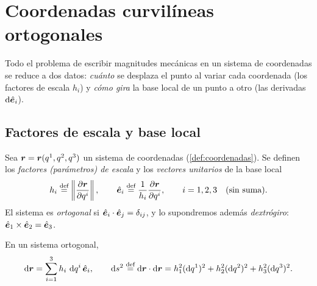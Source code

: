 \section{Coordenadas curvilíneas ortogonales}
\label{sec:curvilineas}

Todo el problema de escribir magnitudes mecánicas en un sistema de
coordenadas se reduce a dos datos: \emph{cuánto} se desplaza el punto al
variar cada coordenada (los factores de escala $h_{i}$) y \emph{cómo gira}
la base local de un punto a otro (las derivadas $\mathop{}\!\mathrm{d}\hat{\bm{e}}_{i}$).

\subsection{Factores de escala y base local}

\begin{definicion}
\label{def:escala}
Sea $\bm{r}=\bm{r}(q^{1},q^{2},q^{3})$ un sistema de coordenadas
(\cref{def:coordenadas}). Se definen los \emph{factores (parámetros) de
escala} y los \emph{vectores unitarios} de la base local
\begin{equation}
  h_{i}\stackrel{\text{def}}{=}\left\lVert \frac{\partial \bm{r}}{\partial q^{i}}\right\rVert,\qquad
  \hat{\bm{e}}_{i}\stackrel{\text{def}}{=}\frac{1}{h_{i}}\frac{\partial \bm{r}}{\partial q^{i}},\qquad i=1,2,3
  \quad(\text{sin suma}).
  \label{eq:escala}
\end{equation}
El sistema es \emph{ortogonal} si $\hat{\bm{e}}_{i}\cdot\hat{\bm{e}}_{j}=\delta_{ij}$, y
lo supondremos además \emph{dextrógiro}: $\hat{\bm{e}}_{1}\times\hat{\bm{e}}_{2}=\hat{\bm{e}}_{3}$.
\end{definicion}

\begin{proposicion}
\label{prop:metrica}
En un sistema ortogonal,
\begin{equation}
  \dd\vb{r}=\sum_{i=1}^{3}h_{i}\,\dd q^{i}\,\uv{e}_{i},
  \qquad
  \dd s^{2}\defeq\dd\vb{r}\cdot\dd\vb{r}
  =h_{1}^{2}(\dd q^{1})^{2}+h_{2}^{2}(\dd q^{2})^{2}+h_{3}^{2}(\dd q^{3})^{2}.
  \label{eq:metrica}
\end{equation}
\end{proposicion}

